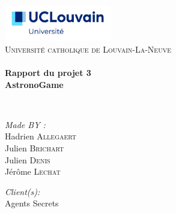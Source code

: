 \begin{titlepage}
\begin{center}

~\bigskip

\includegraphics[width=0.35\textwidth]{./logoucl}\\[1cm]

\textsc{\LARGE Université catholique de Louvain-La-Neuve}\\[1.5cm]

\HRule \\[0.4cm]

{\huge \bfseries Rapport du projet 3\\
AstronoGame \\[0.4cm] }

\HRule \\[1.5cm]

\begin{minipage}{0.4\textwidth}
\begin{flushleft} \large
\emph{Made BY :}\\
Hadrien \textsc{Allegaert}\\
Julien \textsc{Brichart}\\
Julien \textsc{Denis}\\
Jérôme \textsc{Lechat}
\end{flushleft}
\end{minipage}
\begin{minipage}{0.4\textwidth}
\begin{flushright} \large
\emph{Client(s):} \\
Agents Secrets
\end{flushright}
\end{minipage}


\end{center}
\end{titlepage}
